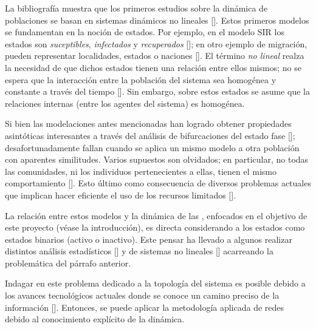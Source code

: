 \documentclass[../main.tex]{subfiles}
\begin{document}
\onehalfspacing

La bibliografía muestra que los primeros estudios sobre la dinámica de poblaciones se basan en sistemas dinámicos no lineales [\cite{Dimitrova2000,MT_MAY, royanderson1992}]. Estos primeros modelos se fundamentan en la noción de estados. Por ejemplo,  en el modelo SIR los estados son \textit{suceptibles}, \textit{infectados} y \textit{recuperados} [\cite{royanderson1992}]; en otro ejemplo de migración, pueden representar localidades, estados o naciones [\cite{Dimitrova2000,MT_MAY,Olsson1965}]. El término \textit{no lineal} realza la necesidad de que dichos estados tienen una relación entre ellos mismos; no se espera que la interacción entre la  población del sistema sea homogénea y constante a través del tiempo [\cite{Barabsi2005}]. Sin embargo, sobre estos estados se asume que la relaciones internas (entre los agentes del sistema) es homogénea.



Si bien las modelaciones antes mencionadas han logrado obtener propiedades asintóticas interesantes a través del análisis de bifurcaciones del estado fase [\cite{Dimitrova2000}]; desafortunadamente fallan cuando se aplica un mismo modelo a otra población con aparentes similitudes. Varios supuestos son olvidados; en particular, no todas las comunidades, ni los individuos pertenecientes a ellas, tienen el mismo comportamiento [\cite{Keeling2005}]. Esto último como consecuencia de diversos problemas actuales que implican hacer eficiente el uso de los recursos limitados [\cite{Barabsi2005}].

La relación entre estos modelos y la dinámica de las \RMS, enfocados en el objetivo de este proyecto (véase la introducción), es directa considerando a los estados como estados binarios (activo o inactivo). Este pensar ha llevado a algunos realizar distintos análisis estadísticos [\cite{an_Twitter_Zubiaga2014}] y de sistemas no lineales [\cite{an_Twitter_dinamics}] acarreando la problemática del párrafo anterior.

Indagar en este problema dedicado a la topología del sistema es posible debido a los avances tecnológicos actuales donde se conoce un camino preciso de la información [\cite{Miller2011}]. Entonces, se puede aplicar la metodología aplicada de redes debido al conocimiento explícito de la dinámica.
\end{document}
